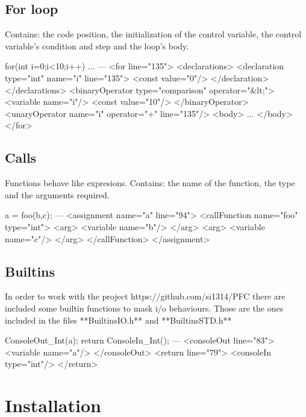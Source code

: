 \subsection*{For loop}

Contains: the code position, the initialization of the control variable, the control variable's condition and step and the loop's body. 

        for(int i=0;i<10;i++){
            ...
        }
---
        <for line="135">
            <declarations>
                <declaration type="int" name="i" line="135">
                    <const value="0"/>
                </declaration>
            </declarations>
            <binaryOperator type="comparison" operator="&lt;">
                <variable name="i"/>
                <const value="10"/>
            </binaryOperator>
            <unaryOperator name="i" operator="+" line="135"/>
            <body>
                ...
            </body>
        </for>

\subsection*{Calls}

Functions behave like expresions. 
Contains: the name of the function, the type and the arguments required.

        a = foo(b,c);
---
        <assignment name="a" line="94">
            <callFunction name="foo" type="int">
                <arg>
                    <variable name="b"/>
                </arg>
                <arg>
                    <variable name="c"/>
                </arg>
            </callFunction>
        </assignment>

\subsection*{Builtins}

In order to work with the project 
        https://github.com/si1314/PFC 
there are included some builtin functions to mask i/o behaviours. Those are the ones included in the files **BuiltinsIO.h** and **BuiltinsSTD.h**

        ConsoleOut_Int(a);
        return ConsoleIn_Int();
---
        <consoleOut line="83">
            <variable name="a"/>
        </consoleOut>
        <return line="79">
            <consoleIn type="int"/>
        </return>

\section{Installation}

